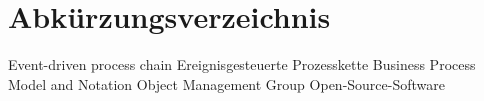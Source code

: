 
\tableofcontents
\restoregeometry
 \clearpage 

 
\section*{Abkürzungsverzeichnis}
\begin{acronym}
\setlength{\itemsep}{-\parsep} %
  Event-driven process chain
  Ereignisgesteuerte Prozesskette
  Business Process Model and Notation
  Object Management Group
  Open-Source-Software
\end{acronym}
\clearpage

\listoffigures
{}
 
\clearpage

\listoftables

\fancyhead[L]{\rightmark}


\cleardoublepage
{} 